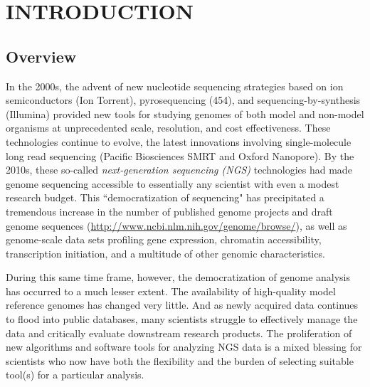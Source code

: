 \chapter{INTRODUCTION}

\section{Overview}

In the 2000s, the advent of new nucleotide sequencing strategies based on ion semiconductors (Ion Torrent), pyrosequencing (454), and sequencing-by-synthesis (Illumina) provided new tools for studying genomes of both model and non-model organisms at unprecedented scale, resolution, and cost effectiveness.
These technologies continue to evolve, the latest innovations involving single-molecule long read sequencing (Pacific Biosciences SMRT and Oxford Nanopore).
By the 2010s, these so-called \textit{next-generation sequencing (NGS)} technologies had made genome sequencing accessible to essentially any scientist with even a modest research budget.
This ``democratization of sequencing" has precipitated a tremendous increase in the number of published genome projects and draft genome sequences (\url{http://www.ncbi.nlm.nih.gov/genome/browse/}), as well as genome-scale data sets profiling gene expression, chromatin accessibility, transcription initiation, and a multitude of other genomic characteristics.

During this same time frame, however, the democratization of genome analysis has occurred to a much lesser extent.
The availability of high-quality model reference genomes has changed very little.
And as newly acquired data continues to flood into public databases, many scientists struggle to effectively manage the data and critically evaluate downstream research products.
The proliferation of new algorithms and software tools for analyzing NGS data is a mixed blessing for scientists who now have both the flexibility and the burden of selecting suitable tool(s) for a particular analysis.

